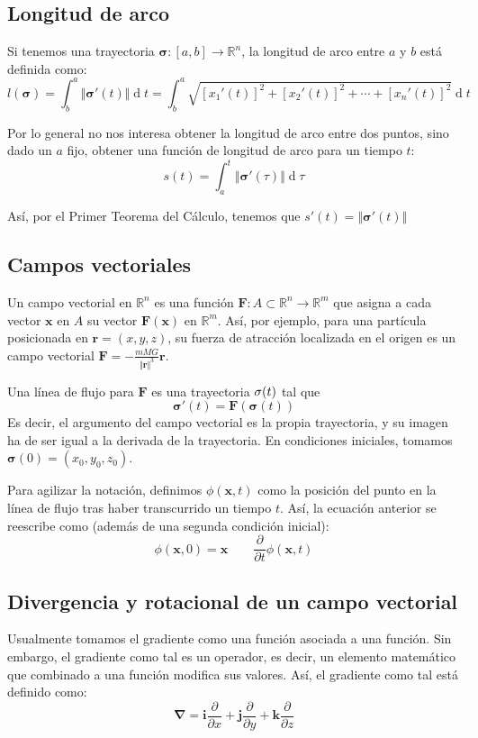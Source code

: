 \documentclass[a4paper]{article}
\renewcommand{\d}[1]{\ensuremath{\operatorname{d}\!{#1}}}
\begin{document}
\subsection{Longitud de arco}
Si tenemos una trayectoria $\boldsymbol{\sigma}:[a,b] \rightarrow \mathbb{R}^n$, la longitud de arco entre $a$ y $b$ está definida como:
\[ l(\boldsymbol{\sigma}) = \int^a_b{\Vert\boldsymbol{\sigma}'(t)\Vert \d t} = \int^a_b{\sqrt{ [x_1'(t)]^2+[x_2'(t)]^2+\cdots+[x_n'(t)]^2 }} \d t \]

Por lo general no nos interesa obtener la longitud de arco entre dos puntos, sino dado un $a$ fijo, obtener una función de longitud de arco para un tiempo $t$:
\[  s(t) = \int_a^t{\Vert\boldsymbol{\sigma}'(\tau)\Vert \d \tau} \]

Así, por el Primer Teorema del Cálculo, tenemos que $s'(t) = \Vert\boldsymbol{\sigma}'(t)\Vert$

\subsection{Campos vectoriales}
Un campo vectorial en $\mathbb{R}^n$ es una función $\textbf{F}: A  \subset \mathbb{R}^n \rightarrow \mathbb{R}^m$ que asigna a cada vector $\textbf{x}$ en $A$ su vector $\textbf{F}(\textbf{x})$ en $\mathbb{R}^m$. Así, por ejemplo, para una partícula posicionada en $\textbf{r}  =(x,y,z)$, su fuerza de atracción localizada en el origen es un campo vectorial $\textbf{F} = - \frac{mMG}{\Vert\textbf{r}\Vert^3}\textbf{r}$.

Una línea de flujo para $\textbf{F}$ es una trayectoria $\boldmath{\sigma}(t)$ tal que 
\[ \boldsymbol{\sigma}'(t) = \textbf{F}(\boldsymbol{\sigma}(t)) \]
Es decir, el argumento del campo vectorial es la propia trayectoria, y su imagen ha de ser igual a la derivada de la trayectoria. En condiciones iniciales, tomamos $\boldsymbol{\sigma}(0) = (x_0, y_0, z_0)$.

Para agilizar la notación, definimos $\phi(\textbf{x}, t)$ como la posición del punto en la línea de flujo tras haber transcurrido un tiempo $t$. Así, la ecuación anterior se reescribe como (además de una segunda condición inicial):
\[ \phi(\textbf{x}, 0) = \textbf{x} \qquad \frac{\partial}{\partial t} \phi(\textbf{x}, t)  \]

\subsection{Divergencia y rotacional de un campo vectorial}
Usualmente tomamos el gradiente como una función asociada a una función. Sin embargo, el gradiente como tal es un operador, es decir, un elemento matemático que combinado a una función modifica sus valores. Así, el gradiente como tal está definido como:
\[ \boldsymbol{\nabla}  = \textbf{i}\frac{\partial}{\partial x} + \textbf{j}\frac{\partial}{\partial y} + \textbf{k}\frac{\partial}{\partial z}\]
\end{document}
